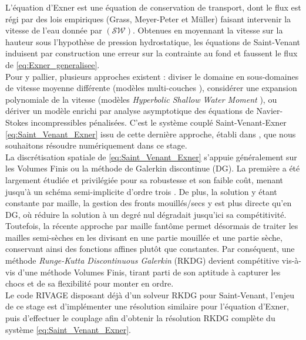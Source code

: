 \documentclass[11pt, a4paper, oneside]{report}
\begin{document}
L'équation d'Exner est une équation de conservation de transport, dont le flux est régi par des lois empiriques (Grass, Meyer-Peter et Müller) faisant intervenir la vitesse de l'eau donnée par $(\mathcal{SW})$.
Obtenues en moyennant la vitesse sur la hauteur sous l'hypothèse de pression hydrostatique, les équations de Saint-Venant induisent par construction une erreur sur la contrainte au fond et faussent le flux de \eqref{eq:Exner_generalisee}. \\
Pour y pallier, plusieurs approches existent : diviser le domaine en sous-domaines de vitesse moyenne différente (modèles multi-couches \cite{bonaventura2018multilayer}), considérer une expansion polynomiale de la vitesse (modèles \textit{Hyperbolic Shallow Water Moment} \cite{kowalski2017moment,garres2020shallow,parvin2025coupled}), ou dériver un modèle enrichi par analyse asymptotique des équations de Navier-Stokes incompressibles pénalisées.
C'est le système couplé Saint-Venant-Exner \eqref{eq:Saint_Venant_Exner} issu de cette dernière approche, établi dans \cite{ba2026coupled}, que nous souhaitons résoudre numériquement dans ce stage. \\

La discrétisation spatiale de \eqref{eq:Saint_Venant_Exner} s'appuie généralement sur les Volumes Finis ou la méthode de Galerkin discontinue (DG). La première a été largement étudiée et privilégiée pour sa robustesse et son faible coût, menant jusqu'à un schéma semi-implicite d'ordre trois \cite{fernandez2025third}. De plus, la solution y étant constante par maille, la gestion des fronts mouillés/secs y est plus directe qu'en DG, où réduire la solution à un degré nul dégradait jusqu'ici sa compétitivité. \\
Toutefois, la récente approche par maille fantôme \cite{poussel2025wetting} permet désormais de traiter les mailles semi-sèches en les divisant en une partie mouillée et une partie sèche, conservant ainsi des fonctions affines plutôt que constantes.
Par conséquent, une méthode \textit{Runge-Kutta Discontinuous Galerkin} (RKDG) devient compétitive vis-à-vis d'une méthode Volumes Finis, tirant parti de son aptitude à capturer les chocs et de sa flexibilité pour monter en ordre. \\
Le code RIVAGE disposant déjà d'un solveur RKDG pour Saint-Venant, l'enjeu de ce stage est d'implémenter une résolution similaire pour l'équation d'Exner, puis d'effectuer le couplage afin d'obtenir la résolution RKDG complète du système \eqref{eq:Saint_Venant_Exner}.
\end{document}
